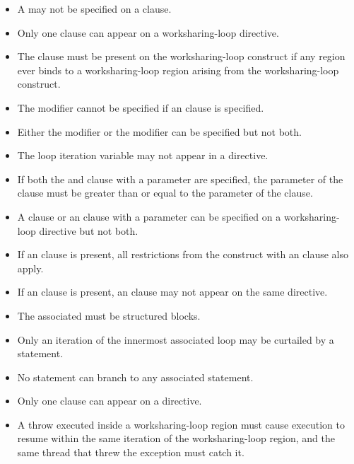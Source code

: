 \begin{itemize}
\item A  may not be specified on a  clause.

\item Only one  clause can appear on a worksharing-loop directive.

\item The  clause must be present on the worksharing-loop construct if any  region
ever binds to a worksharing-loop region arising from the worksharing-loop construct.

\item The  modifier cannot be specified if an  clause is specified.

\item Either the  modifier or the  modifier can be specified but not both.

\item The loop iteration variable may not appear in a  directive.

\item If both the  and  clause with a parameter are specified,
the parameter of the  clause must be greater than or equal to the parameter of the
 clause.

\item A  clause or an  clause with a parameter can
    be specified on a worksharing-loop directive but not both.

\item If an  clause is present, all restrictions from
  the  construct with an  clause also apply.

\item If an  clause is present, an 
  clause may not appear on the same directive.

\end{itemize}

\begin{ccppspecific}
\begin{itemize}
\item The associated  must be structured blocks.

\item Only an iteration of the innermost associated loop may be curtailed by a 
statement.

\item No statement can branch to any associated  statement.

\item Only one  clause can appear on a  directive.

\item A throw executed inside a worksharing-loop region must cause execution to resume within the
same iteration of the worksharing-loop region, and the same thread that threw the exception must
catch it.
\end{itemize}
\end{ccppspecific}

